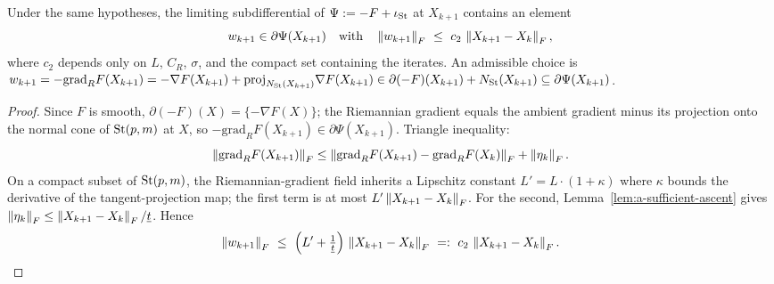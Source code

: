 \begin{lemma}
\label{lem:a-relative-error}
Under the same hypotheses, the limiting subdifferential of $\Psi:=-F+\iota_{\mathrm{St}}$ at $X_{k+1}$ contains an element
\[
w_{k+1}\in\partial\Psi(X_{k+1})
\quad\text{with}\quad
\left\lVert w_{k+1} \right\rVert_F\ \le\ c_2\,\left\lVert X_{k+1}-X_k \right\rVert_F,
\]
where $c_2$ depends only on $L$, $C_R$, $\sigma$, and the compact set containing the iterates. An admissible choice is $w_{k+1}=-\mathrm{grad}_R F(X_{k+1})=-\nabla F(X_{k+1})+\mathrm{proj}_{N_{\mathrm{St}}(X_{k+1})}\nabla F(X_{k+1})\in\partial(-F)(X_{k+1})+N_{\mathrm{St}}(X_{k+1})\subseteq\partial\Psi(X_{k+1})$.
\end{lemma}
\begin{proof}
Since $F$ is smooth, $\partial(-F)(X)=\{-\nabla F(X)\}$; the Riemannian gradient equals the ambient gradient minus its projection onto the normal cone of $\mathrm{St}(p,m)$ at $X$, so $-\mathrm{grad}_R F(X_{k+1})\in\partial\Psi(X_{k+1})$. Triangle inequality:
\[
\left\lVert \mathrm{grad}_R F(X_{k+1}) \right\rVert_F
\le \left\lVert \mathrm{grad}_R F(X_{k+1})-\mathrm{grad}_R F(X_k) \right\rVert_F+\left\lVert \eta_k \right\rVert_F.
\]
On a compact subset of $\mathrm{St}(p,m)$, the Riemannian-gradient field inherits a Lipschitz constant $L'=L\cdot(1+\kappa)$ where $\kappa$ bounds the derivative of the tangent-projection map; the first term is at most $L'\left\lVert X_{k+1}-X_k \right\rVert_F$. For the second, Lemma~\ref{lem:a-sufficient-ascent} gives $\left\lVert \eta_k \right\rVert_F\le\left\lVert X_{k+1}-X_k \right\rVert_F/\underline t$. Hence
\[
\norm{w_{k+1}}_F\ \le\ \Bigl(L'+\tfrac1{\underline t}\Bigr)\,\norm{X_{k+1}-X_k}_F\ =:\ c_2\,\norm{X_{k+1}-X_k}_F.
\]
\end{proof}

